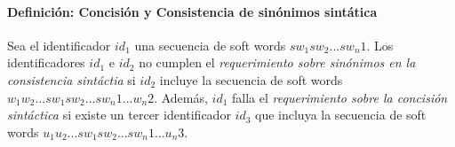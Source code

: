 \paragraph{Definición: Concisión y Consistencia de sinónimos sintática}
Sea el identificador $id_1$ una secuencia de soft words $sw_1 sw_2 ... sw_n1$. 
Los identificadores $id_1$ e $id_2$ no cumplen el \textit{requerimiento sobre sinónimos en la consistencia sintáctia} si $id_2$ incluye la secuencia de soft words $w_1 w_2 ... sw_1 sw_2 ... sw_n1 ... w_n2$. 
Además, $id_1$ falla el \textit{requerimiento sobre la concisión sintáctica} si existe un tercer identificador $id_3$ que incluya la secuencia de soft words $u_1 u_2 ... sw_1 sw_2 ... sw_n1 ... u_n3$.

